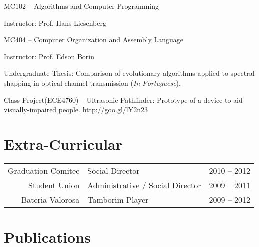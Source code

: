 \documentclass[]{deedy-resume-openfont}
\begin{document}
\begin{minipage}[t]{0.66\textwidth}
\begin{tightemize}
	\item MC102 – Algorithms and Computer Programming
	\item Instructor: Prof. Hans Liesenberg
\end{tightemize}
\begin{tightemize}
	\item MC404 – Computer Organization and	Assembly Language
	\item Instructor: Prof. Edson Borin 
\end{tightemize}
\sectionsep




\descript{ }
\begin{tightemize}
	\item Undergraduate Thesis: Comparison of evolutionary algorithms applied to spectral shapping in optical channel transmission (\textit{In Portuguese}).
	\item Class Project(ECE4760) – Ultrasonic Pathfinder: Prototype of a device to aid visually-impaired people. \href{http://goo.gl/lY2n23} {http://goo.gl/lY2n23}
	
	
	
\end{tightemize}
\sectionsep


\section{Extra-Curricular} 
\begin{tabular}{rll}
Graduation Comitee  & Social Director &2010 – 2012	      \\
Student Union & Administrative / Social   Director &2009 – 2011 \\
Bateria Valorosa &Tamborim Player  & 2009 – 2012 \\
\end{tabular}

\sectionsep


\section{Publications} 
\renewcommand\refname{\vskip -1.5cm} %
\vskip 1cm
\footnotesize


\nocite{*}

\end{minipage} 
\end{document}
